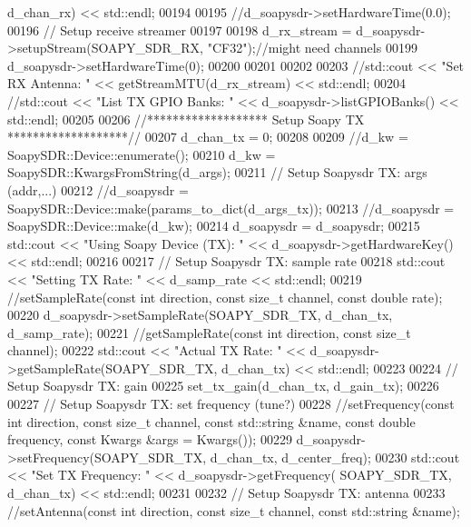 \begin{DoxyCode}
      d_chan_rx) << std::endl;
00194 
00195       \textcolor{comment}{//d\_soapysdr->setHardwareTime(0.0);}
00196       \textcolor{comment}{// Setup receive streamer}
00197 
00198       d_rx_stream = d_soapysdr->setupStream(SOAPY_SDR_RX, \textcolor{stringliteral}{"CF32"});\textcolor{comment}{//might need channels}
00199       d_soapysdr->setHardwareTime(0);
00200 
00201 
00202 
00203       \textcolor{comment}{//std::cout << "Set RX Antenna: " << getStreamMTU(d\_rx\_stream) << std::endl;}
00204       \textcolor{comment}{//std::cout << "List TX GPIO Banks: " << d\_soapysdr->listGPIOBanks() << std::endl;}
00205 
00206       \textcolor{comment}{//******************* Setup Soapy TX *******************//}
00207       d_chan_tx = 0;
00208 
00209       \textcolor{comment}{//d\_kw = SoapySDR::Device::enumerate();}
00210       d_kw = SoapySDR::KwargsFromString(d_args);
00211       \textcolor{comment}{// Setup Soapysdr TX: args (addr,...)}
00212       \textcolor{comment}{//d\_soapysdr = SoapySDR::Device::make(params\_to\_dict(d\_args\_tx));}
00213       \textcolor{comment}{//d\_soapysdr = SoapySDR::Device::make(d\_kw);}
00214       d_soapysdr = d_soapysdr;
00215       std::cout << \textcolor{stringliteral}{"Using Soapy Device (TX): "}  << d_soapysdr->getHardwareKey() << std::endl;
00216 
00217       \textcolor{comment}{// Setup Soapysdr TX: sample rate}
00218       std::cout << \textcolor{stringliteral}{"Setting TX Rate: "} << d_samp_rate << std::endl;
00219       \textcolor{comment}{//setSampleRate(const int direction, const size\_t channel, const double rate);}
00220       d_soapysdr->setSampleRate(SOAPY_SDR_TX, d_chan_tx, d_samp_rate);
00221       \textcolor{comment}{//getSampleRate(const int direction, const size\_t channel);}
00222       std::cout << \textcolor{stringliteral}{"Actual TX Rate: "} << d_soapysdr->getSampleRate(SOAPY_SDR_TX, 
      d_chan_tx) << std::endl;
00223 
00224       \textcolor{comment}{// Setup Soapysdr TX: gain}
00225       set_tx_gain(d_chan_tx, d_gain_tx);
00226 
00227       \textcolor{comment}{// Setup Soapysdr TX: set frequency (tune?)}
00228       \textcolor{comment}{//setFrequency(const int direction, const size\_t channel, const std::string &name, const double
       frequency, const Kwargs &args = Kwargs());}
00229       d_soapysdr->setFrequency(SOAPY_SDR_TX, d_chan_tx, d_center_freq);
00230       std::cout << \textcolor{stringliteral}{"Set TX Frequency: "}  << d_soapysdr->getFrequency(
      SOAPY_SDR_TX, d_chan_tx) << std::endl;
00231 
00232       \textcolor{comment}{// Setup Soapysdr TX: antenna}
00233       \textcolor{comment}{//setAntenna(const int direction, const size\_t channel, const std::string &name);}

\end{DoxyCode}

